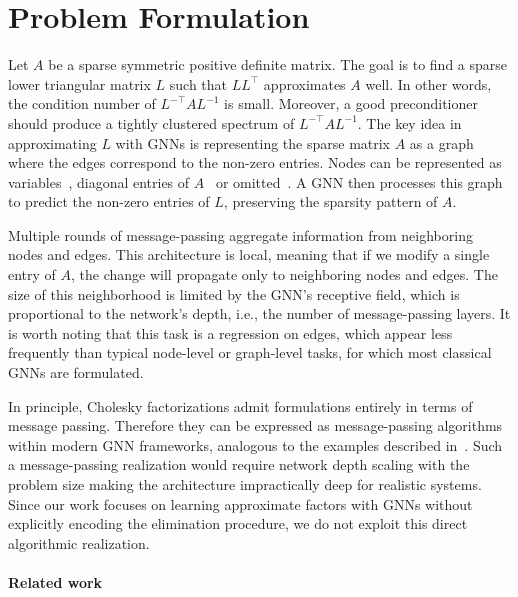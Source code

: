 \documentclass[10pt]{article} %
\theoremstyle{plain}
\theoremstyle{definition}
\theoremstyle{remark}
\begin{document}
\section{Problem Formulation}
Let $A$ be a sparse symmetric positive definite matrix. The goal is to find a sparse lower triangular matrix $L$ such that $L L^{\top}$ approximates $A$ well. In other words, the condition number of $L^{-\top} A L^{-1}$ is small. Moreover, a good preconditioner should produce a tightly clustered spectrum of $L^{-\top} A L^{-1}$. The key idea in approximating $L$ with GNNs is representing the sparse matrix $A$ as a graph where the edges correspond to the non-zero entries. Nodes can be represented as variables~\citep{li2023learning}, diagonal entries of $A$~\citep{li2024generative} or omitted~\citep{trifonov2024learning}. A GNN then processes this graph to predict the non-zero entries of $L$, preserving the sparsity pattern of $A$.

Multiple rounds of message-passing aggregate information from neighboring nodes and edges. This architecture is local, meaning that if we modify a single entry of $A$, the change will propagate only to neighboring nodes and edges. The size of this neighborhood is limited by the GNN's receptive field, which is proportional to the network's depth, i.e., the number of message-passing layers. It is worth noting that this task is a regression on edges, which appear less frequently than typical node-level or graph-level tasks, for which most classical GNNs are formulated.

In principle, Cholesky factorizations admit formulations entirely in terms of message passing. Therefore they can be expressed as message-passing algorithms within modern GNN frameworks, analogous to the examples described in~\citet{moore2025graph}. Such a message-passing realization would require network depth scaling with the problem size making the architecture impractically deep for realistic systems. Since our work focuses on learning approximate factors with GNNs without explicitly encoding the elimination procedure, we do not exploit this direct algorithmic realization.

\paragraph{Related work}
\end{document}
